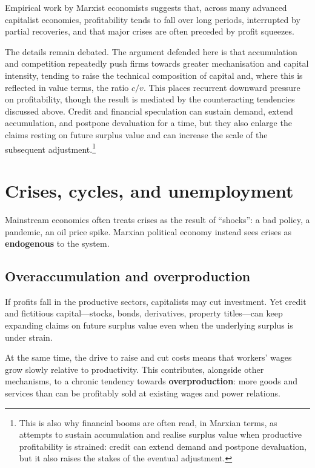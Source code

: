 Empirical work by Marxist economists suggests that, across many advanced
capitalist economies, profitability tends to fall over long periods, interrupted
by partial recoveries, and that major crises are often preceded by profit
squeezes.\cite{Roberts2016,Shaikh2016}

The details remain debated. The argument defended here is that accumulation
and competition repeatedly push firms towards greater mechanisation and capital
intensity, tending to raise the technical composition of capital and, where this
is reflected in value terms, the ratio \(c/v\). This places recurrent downward
pressure on profitability, though the result is mediated by the counteracting
tendencies discussed above. Credit and financial speculation can sustain demand,
extend accumulation, and postpone devaluation for a time, but they also enlarge
the claims resting on future surplus value and can increase the scale of the
subsequent adjustment.\footnote{This is also why financial booms are often read, in Marxian terms, as attempts to sustain accumulation and realise surplus value when productive profitability is strained: credit can extend demand and postpone devaluation, but it also raises the stakes of the eventual adjustment.}

\section{Crises, cycles, and unemployment}
\label{sec:crises}

Mainstream economics often treats crises as the result of ``shocks'': a bad
policy, a pandemic, an oil price spike. Marxian political economy instead
sees crises as \textbf{endogenous} to the system.

\subsection{Overaccumulation and overproduction}

If profits fall in the productive sectors, capitalists may cut investment.
Yet credit and fictitious capital---stocks, bonds, derivatives, property
titles---can keep expanding claims on future surplus value even when the
underlying surplus is under strain.\cite{HarveyNewImperialism}

At the same time, the drive to raise \exploitrate{} and cut costs means that
workers' wages grow slowly relative to productivity. This contributes, alongside other mechanisms, to a chronic
tendency towards \textbf{overproduction}: more goods and services than can
be profitably sold at existing wages and power relations.


